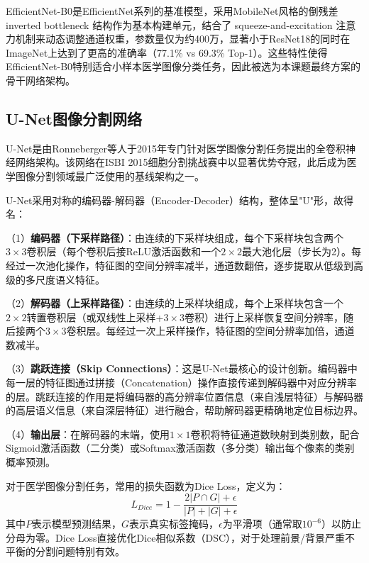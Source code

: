 EfficientNet-B0是EfficientNet系列的基准模型，采用MobileNet风格的倒残差 inverted bottleneck 结构作为基本构建单元，结合了 squeeze-and-excitation 注意力机制来动态调整通道权重，参数量仅为约400万，显著小于ResNet18的同时在ImageNet上达到了更高的准确率（77.1\% vs 69.3\% Top-1）。这些特性使得EfficientNet-B0特别适合小样本医学图像分类任务，因此被选为本课题最终方案的骨干网络架构。


\subsection{U-Net图像分割网络}

U-Net\cite{ronneberger2015u}是由Ronneberger等人于2015年专门针对医学图像分割任务提出的全卷积神经网络架构。该网络在ISBI 2015细胞分割挑战赛中以显著优势夺冠，此后成为医学图像分割领域最广泛使用的基线架构之一。

U-Net采用对称的编码器-解码器（Encoder-Decoder）结构，整体呈"U"形，故得名：

（1）\textbf{编码器（下采样路径）}：由连续的下采样块组成，每个下采样块包含两个$3\times3$卷积层（每个卷积后接ReLU激活函数和一个$2\times2$最大池化层（步长为2）。每经过一次池化操作，特征图的空间分辨率减半，通道数翻倍，逐步提取从低级到高级的多尺度语义特征。

（2）\textbf{解码器（上采样路径）}：由连续的上采样块组成，每个上采样块包含一个$2\times2$转置卷积层（或双线性上采样+$3\times3$卷积）进行上采样恢复空间分辨率，随后接两个$3\times3$卷积层。每经过一次上采样操作，特征图的空间分辨率加倍，通道数减半。

（3）\textbf{跳跃连接（Skip Connections）}：这是U-Net最核心的设计创新。编码器中每一层的特征图通过拼接（Concatenation）操作直接传递到解码器中对应分辨率的层。跳跃连接的作用是将编码器的高分辨率位置信息（来自浅层特征）与解码器的高层语义信息（来自深层特征）进行融合，帮助解码器更精确地定位目标边界。

（4）\textbf{输出层}：在解码器的末端，使用$1\times1$卷积将特征通道数映射到类别数，配合Sigmoid激活函数（二分类）或Softmax激活函数（多分类）输出每个像素的类别概率预测。

对于医学图像分割任务，常用的损失函数为Dice Loss，定义为：
\begin{equation}
    \label{eq:dice}
    L_{Dice} = 1 - \frac{2|P \cap G| + \epsilon}{|P| + |G| + \epsilon}
\end{equation}
其中$P$表示模型预测结果，$G$表示真实标签掩码，$\epsilon$为平滑项（通常取$10^{-6}$）以防止分母为零。Dice Loss直接优化Dice相似系数（DSC），对于处理前景/背景严重不平衡的分割问题特别有效。


